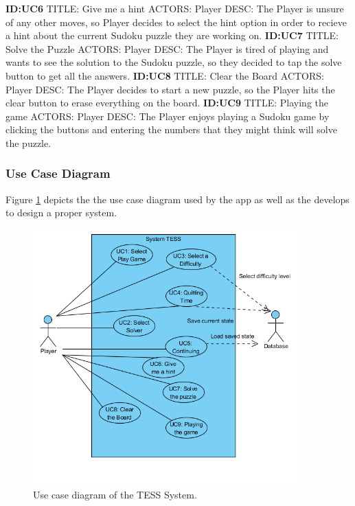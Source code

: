 \documentclass{article}
\begin{document}
\textbf{ID:UC6} \newline TITLE: Give me a hint \newline ACTORS: Player \newline DESC: The Player is unsure of any other moves, so Player decides to select the hint option in order to recieve a hint about the current Sudoku puzzle they are working on. \newline \newline
\textbf{ID:UC7} \newline TITLE: Solve the Puzzle \newline ACTORS: Player \newline DESC: The Player is tired of playing and wants to see the solution to the Sudoku puzzle, so they decided to tap the solve button to get all the answers. \newline \newline
\textbf{ID:UC8} \newline TITLE: Clear the Board \newline ACTORS: Player \newline DESC: The Player decides to start a new puzzle, so the Player hits the clear button to erase everything on the board. \newline \newline
\textbf{ID:UC9} \newline TITLE: Playing the game \newline ACTORS: Player \newline DESC: The Player enjoys playing a Sudoku game by clicking the buttons and entering the numbers that they might think will solve the puzzle. \newline
\subsubsection{Use Case Diagram}
Figure \ref{fig:usecasediagram} depicts the the use case diagram used by the app as well as the develops to design a proper system.
\begin{figure}[h!]\centering
	\includegraphics[width=4.0in]{./Figure/Usecase_Diagram.PNG}
	\caption{Use case diagram of the TESS System.}\label{fig:usecasediagram}
\end{figure}
\end{document}
